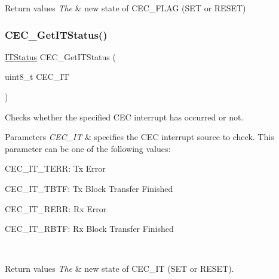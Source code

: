 \begin{DoxyRetVals}{Return values}
{\em The} & new state of C\+E\+C\+\_\+\+F\+L\+AG (S\+ET or R\+E\+S\+ET) \\
\hline
\end{DoxyRetVals}
\mbox{\label{group___c_e_c___private___functions_gaa1940a388d0bfcefe7483fb74cc2ba1d}} 
\subsubsection{\texorpdfstring{CEC\_GetITStatus()}{CEC\_GetITStatus()}}
{\footnotesize\ttfamily \mbox{\hyperlink{group___exported__types_gaacbd7ed539db0aacd973a0f6eca34074}{I\+T\+Status}} C\+E\+C\+\_\+\+Get\+I\+T\+Status (\begin{DoxyParamCaption}\item[{uint8\+\_\+t}]{C\+E\+C\+\_\+\+IT }\end{DoxyParamCaption})}



Checks whether the specified C\+EC interrupt has occurred or not. 


\begin{DoxyParams}{Parameters}
{\em C\+E\+C\+\_\+\+IT} & specifies the C\+EC interrupt source to check. This parameter can be one of the following values\+: \begin{DoxyItemize}
\item C\+E\+C\+\_\+\+I\+T\+\_\+\+T\+E\+RR\+: Tx Error \item C\+E\+C\+\_\+\+I\+T\+\_\+\+T\+B\+TF\+: Tx Block Transfer Finished \item C\+E\+C\+\_\+\+I\+T\+\_\+\+R\+E\+RR\+: Rx Error \item C\+E\+C\+\_\+\+I\+T\+\_\+\+R\+B\+TF\+: Rx Block Transfer Finished \end{DoxyItemize}
\\
\hline
\end{DoxyParams}

\begin{DoxyRetVals}{Return values}
{\em The} & new state of C\+E\+C\+\_\+\+IT (S\+ET or R\+E\+S\+ET). \\
\hline
\end{DoxyRetVals}
\mbox{\label{group___c_e_c___private___functions_gaf48aee745a16370372b3eaa7cf3ed22b}} 
